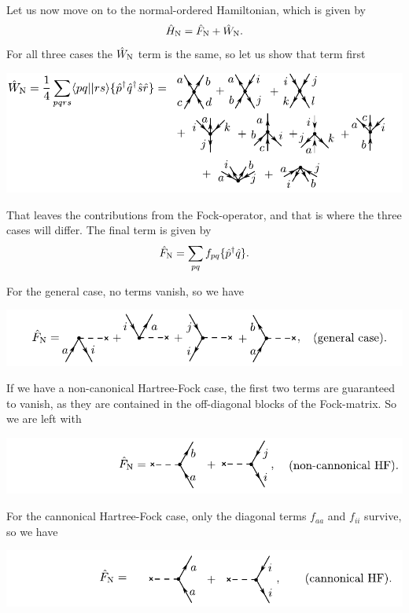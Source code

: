 \documentclass[a4paper, 11pt, notitlepage, english]{article}
\newcommand{\op}[1]{\hat{#1}}
\begin{document}
\clearpage

Let us now move on to the normal-ordered Hamiltonian, which is given by
$$\op{H}_{\rm N} = \op{F}_{\rm N} + \op{W}_{\rm N}.$$
For all three cases the $\op{W}_{\rm N}$ term is the same, so let us show that term first

\begin{centering}
\includegraphics[width=\textwidth]{project2_4b}
\end{centering}That leaves the contributions from the Fock-operator, and that is where the 
three cases will differ. The final term is given by
$$\op{F}_{\rm N} = \sum_{pq} f_{pq} \{\op{p}^\dagger \op{q}\}.$$

For the general case, no terms vanish, so we have

\begin{centering}
\includegraphics[width=\textwidth]{project2_4c}
\end{centering}

If we have a non-canonical Hartree-Fock case, the first two terms are guaranteed to vanish, as they are contained in the off-diagonal blocks of the Fock-matrix. So we are left with

\begin{centering}
\includegraphics[width=\textwidth]{project2_4d}
\end{centering}

For the cannonical Hartree-Fock case, only the diagonal terms $f_{aa}$ and $f_{ii}$ survive, so we have

\begin{centering}
\includegraphics[width=\textwidth]{project2_4e}
\end{centering}
\end{document}

